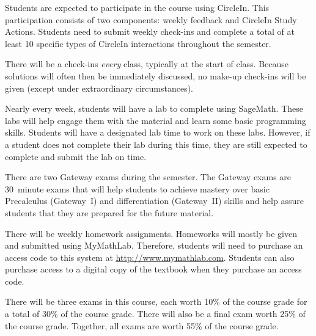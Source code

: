 \documentclass[11pt,letterpaper]{article}
\begin{document}
Students are expected to participate in the course using CircleIn. This participation consists of two components: weekly feedback and CircleIn Study Actions. Students need to submit weekly check-ins and complete a total of at least 10 specific types of CircleIn interactions throughout the semester. 
\pspace


There will be a check-ins \textit{every} class, typically at the start of class. Because solutions will often then be immediately discussed, no make-up check-ins will be given (except under extraordinary circumstances). \pspace


Nearly every week, students will have a lab to complete using SageMath. These labs will help engage them with the material and learn some basic programming skills. Students will have a designated lab time to work on these labs. However, if a student does not complete their lab during this time, they are still expected to complete and submit the lab on time.
\pspace



\newpage



There are two Gateway exams during the semester. The Gateway exams are 30~minute exams that will help students to achieve mastery over basic Precalculus (Gateway~I) and differentiation (Gateway~II) skills and help assure students that they are prepared for the future material. 
\pspace


There will be weekly homework assignments. Homeworks will mostly be given and submitted using MyMathLab. Therefore, students will need to purchase an access code to this system at \url{http://www.mymathlab.com}. Students can also purchase access to a digital copy of the textbook when they purchase an access code.
\pspace


There will be three exams in this course, each worth 10\% of the course grade for a total of 30\% of the course grade. There will also be a final exam worth 25\% of the course grade. Together, all exams are worth 55\% of the course grade. 
\pspace
\end{document}

